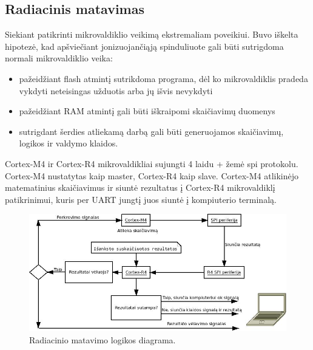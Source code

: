 \documentclass[a4paper, 12pt]{article} %
\begin{document}
\begin{onehalfspacing}
\subsection{Radiacinis matavimas}
Siekiant patikrinti mikrovaldiklio veikim\k{a} ekstremaliam poveikiui. Buvo i\v{s}kelta hipotez\.{e}, kad ap\v{s}vie\v{c}iant jonizuojan\v{c}i\k{a}j\k{a} spinduliuote gali b\={u}ti sutrigdoma normali mikrovaldiklio veika:
\begin{itemize}
\item pa\v{z}eid\v{z}iant flash atmint\k{i} sutrikdoma programa, d\.{e}l ko mikrovaldiklis pradeda vykdyti neteisingas u\v{z}duotis arba j\k{u} i\v{s}vis nevykdyti
\item pa\v{z}eid\v{z}iant RAM atmint\k{i} gali b\={u}ti i\v{s}kraipomi skai\v{c}iavim\k{u} duomenys
\item sutrigdant \v{s}erdies atliekam\k{a} darb\k{a} gali b\={u}ti generuojamos skai\v{c}iavim\k{u}, logikos ir valdymo klaidos.
\end{itemize} 
Cortex-M4 ir Cortex-R4 mikrovaldikliai sujungti 4 laidu + \v{z}em\.{e} spi protokolu. Cortex-M4 nustatytas kaip master, Cortex-R4 kaip slave.
Cortex-M4 atlikin\.{e}jo matematinius skai\v{c}iavimus ir siunt\.{e} rezultatus \k{i} Cortex-R4 mikrovaldikl\k{i} patikrinimui, kuris per UART jungt\k{i} juos siunt\.{e} \k{i} kompiuterio terminal\k{a}.  
\begin{figure}[H] %
\centering %
\includegraphics[scale=0.6]{pav/raddiag.jpg} %
\captionsetup{labelformat=numbfirst} %
\captionsetup{labelseparator=tarpas}
\caption{Radiacinio matavimo logikos diagrama.}
\label{vienas}
\end{figure}
\newpage
   

\end{onehalfspacing}
\end{document}
